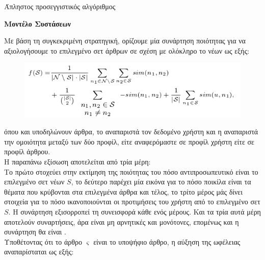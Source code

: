{{{{{{{{\begin{algorithm}
\begin{algorithmic}
 {}
\end{algorithmic}
\caption{Άπληστος προσεγγιστικός αλγόριθμος}
\end{algorithm}


\textbf{{} Μοντέλο Συστάσεων}

Με βάση τη συγκεκριμένη στρατηγική, ορίζουμε μία συνάρτηση ποιότητας {} 
για να αξιολογήσουμε το επιλεγμένο σετ άρθρων {} σε σχέση με ολόκληρο το 
{} νέων {} ως εξής: 

\begin{figure}[!ht] \centering
    \includegraphics[scale=0.6]{static/figures/quality.png}
    \label{}
\end{figure} 

όπου {} και {} υποδηλώνουν άρθρα, το {} αναπαριστά 
τον δεδομένο χρήστη και η {} αναπαριστά την ομοιότητα μεταξύ των δύο προφίλ, 
είτε αναφερόμαστε σε προφίλ χρήστη είτε σε προφίλ άρθρου. \\

Η παραπάνω εξίσωση αποτελείται από τρία μέρη: \\
Το πρώτο στοχεύει στην εκτίμηση της ποιότητας του πόσο αντιπροσωπευτικό είναι το επιλεγμένο σετ νέων $S$, 
το δεύτερο παρέχει μία εικόνα για το πόσο ποικίλα είναι τα θέματα που κρύβονται στα επιλεγμένα άρθρα και τέλος, 
το τρίτο μέρος μάς δίνει στοιχεία για το πόσο ικανοποιούνται οι προτιμήσεις του χρήστη από το επιλεγμένο σετ $S$. 
Η συνάρτηση {} εξισορροπεί τη συνεισφορά κάθε ενός μέρους. 
Και τα τρία αυτά μέρη αποτελούν {} συναρτήσεις, άρα είναι μη αρνητικές και μονότονες, 
επομένως και η συνάρτηση {} θα είναι {}. \\
Υποθέτοντας ότι το άρθρο $\varsigma$ είναι το υποψήφιο άρθρο, η αύξηση της ωφέλειας αναπαρίσταται ως εξής: 

}}}}}}}}
